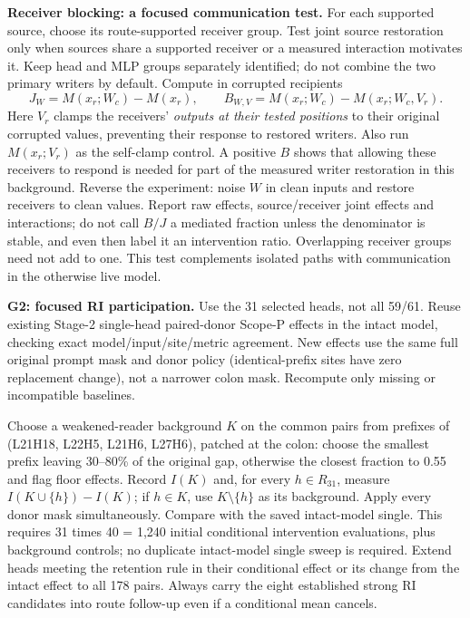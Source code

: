 \documentclass[11pt,a4paper]{article}
\begin{document}
\textbf{Receiver blocking: a focused communication test.} For each supported source, choose its route-supported receiver group. Test joint source restoration only when sources share a supported receiver or a measured interaction motivates it. Keep head and MLP groups separately identified; do not combine the two primary writers by default.
Compute in corrupted recipients
\[
 J_W=M(x_r;W_c)-M(x_r),\qquad
 B_{W,V}=M(x_r;W_c)-M(x_r;W_c,V_r).
\]
Here $V_r$ clamps the receivers' \emph{outputs at their tested positions} to their
original corrupted values, preventing their response to restored writers. Also run
$M(x_r;V_r)$ as the self-clamp control. A positive $B$ shows that allowing these
receivers to respond is needed for part of the measured writer restoration in this
background. Reverse the experiment: noise $W$ in clean inputs and restore receivers
to clean values. Report raw effects, source/receiver joint effects and interactions;
do not call $B/J$ a mediated fraction unless the denominator is stable, and even then
label it an intervention ratio. Overlapping receiver groups need not add to one.
This test complements isolated paths with communication in the otherwise live model.


\textbf{G2: focused RI participation.} Use the 31 selected heads, not all 59/61.
Reuse existing Stage-2 single-head paired-donor Scope-P effects in the intact model,
checking exact model/input/site/metric agreement. New effects use the same full
original prompt mask and donor policy (identical-prefix sites have zero replacement
change), not a narrower colon mask. Recompute only missing or incompatible baselines.

Choose a weakened-reader background $K$ on the common pairs from prefixes of
(L21H18, L22H5, L21H6, L27H6), patched at the colon: choose the smallest prefix
leaving 30--80\% of the original gap, otherwise the closest fraction to 0.55 and
flag floor effects. Record $I(K)$ and, for every $h\in R_{31}$, measure
$I(K\cup\{h\})-I(K)$; if $h\in K$, use $K\setminus\{h\}$ as its background.
Apply every donor mask simultaneously. Compare with the saved intact-model single.
This requires 31 times 40 = 1,240 initial conditional intervention evaluations,
plus background controls; no duplicate intact-model single sweep is required.
Extend heads meeting the retention rule in their conditional effect or its change
from the intact effect to all 178 pairs. Always carry the eight established strong
RI candidates into route follow-up even if a conditional mean cancels.
\end{document}
